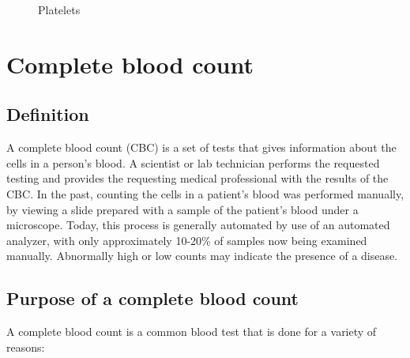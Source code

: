 \vspace{0.2in}

\begin{figure}[h]
\centering
  \vspace{-0.1in}
    \centerline{}
    \caption{Platelets}
\end{figure}

\section{Complete blood count}
\subsection{Definition}

A complete blood count (CBC) is a set of tests that gives information about the cells in a person's blood. A scientist or lab technician performs the requested testing and provides the requesting medical professional with the results of the CBC. In the past, counting the cells in a patient's blood was performed manually, by viewing a slide prepared with a sample of the patient's blood under a microscope. Today, this process is generally automated by use of an automated analyzer, with only approximately 10-20\% of samples now being examined manually. Abnormally high or low counts may indicate the presence of a disease.

\subsection{Purpose of a complete blood count}

A complete blood count is a common blood test that is done for a variety of reasons:

